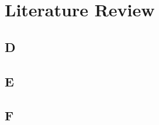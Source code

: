 \chapter{Literature Review}\label{ch:literaturereview}

\section{D}\label{sec:D}
\lipsum[1-5]

\section{E}\label{sec:E}
\lipsum[1-5]

\section{F}\label{sec:F}
\lipsum[1-5]